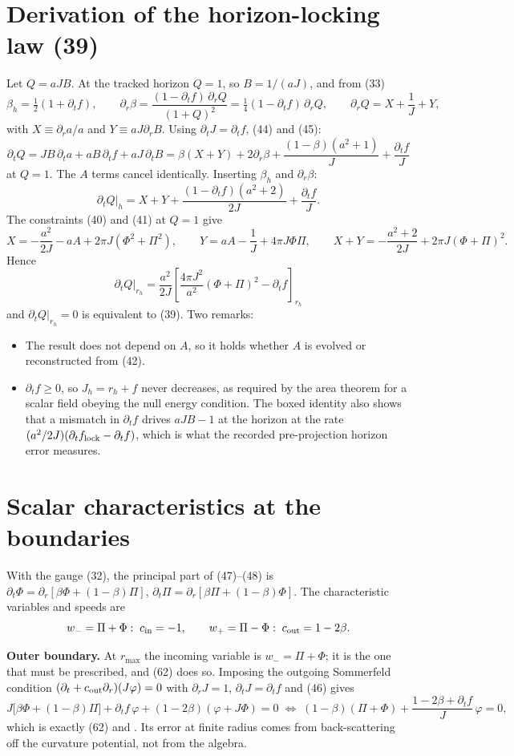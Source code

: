 \documentclass[11pt,a4paper]{article}
\newcommand{\dt}{\partial_t}
\newcommand{\dr}{\partial_r}
\newcommand{\fd}{\partial_t f}
\begin{document}
\appendix
\section{Derivation of the horizon-locking law (39)}\label{app:lock}

Let $Q=aJB$. At the tracked horizon $Q=1$, so $B=1/(aJ)$, and from (33)
\[
  \beta_h=\tfrac12(1+\fd),\qquad
  \dr\beta=\frac{(1-\fd)\,\dr Q}{(1+Q)^2}=\tfrac14(1-\fd)\,\dr Q,\qquad
  \dr Q=X+\frac1J+Y,
\]
with $X\equiv\dr a/a$ and $Y\equiv aJ\dr B$. Using $\dt J=\fd$, (44) and (45):
\[
  \dt Q=JB\,\dt a+aB\,\fd+aJ\,\dt B
  =\beta(X+Y)+2\dr\beta+\frac{(1-\beta)(a^2+1)}{J}+\frac{\fd}{J}
\]
at $Q=1$. The $A$ terms cancel identically. Inserting $\beta_h$ and $\dr\beta$:
\[
  \dt Q\big|_h=X+Y+\frac{(1-\fd)(a^2+2)}{2J}+\frac{\fd}{J}.
\]
The constraints (40) and (41) at $Q=1$ give
\[
  X=-\frac{a^2}{2J}-aA+2\pi J(\Phi^2+\Pi^2),\qquad
  Y=aA-\frac1J+4\pi J\Phi\Pi,\qquad
  X+Y=-\frac{a^2+2}{2J}+2\pi J(\Phi+\Pi)^2 .
\]
Hence
\[
  \boxed{\;\dt Q\big|_{r_h}=\frac{a^2}{2J}\left[\frac{4\pi J^2}{a^2}(\Phi+\Pi)^2-\fd\right]_{r_h}\;}
\]
and $\dt Q|_{r_h}=0$ is equivalent to (39). Two remarks:
\begin{itemize}
\item The result does not depend on $A$, so it holds whether $A$ is evolved or reconstructed from (42).
\item $\fd\ge0$, so $J_h=r_h+f$ never decreases, as required by the area theorem for a scalar field
  obeying the null energy condition. The boxed identity also shows that a mismatch in $\fd$ drives
  $aJB-1$ at the horizon at the rate $(a^2/2J)(\fd_{\rm lock}-\fd)$, which is what the recorded
  pre-projection horizon error measures.
\end{itemize}

\section{Scalar characteristics at the boundaries}\label{app:char}

With the gauge (32), the principal part of (47)--(48) is
$\dt\Phi=\dr[\beta\Phi+(1-\beta)\Pi]$, $\dt\Pi=\dr[\beta\Pi+(1-\beta)\Phi]$. The characteristic
variables and speeds are
\[
  w_-=\Pi+\Phi:\; c_{\rm in}=-1,\qquad
  w_+=\Pi-\Phi:\; c_{\rm out}=1-2\beta.
\]

\textbf{Outer boundary.} At $r_{\max}$ the incoming variable is $w_-=\Pi+\Phi$; it is the one
that must be prescribed, and (62) does so. Imposing the outgoing Sommerfeld condition
$(\dt+c_{\rm out}\dr)(J\varphi)=0$ with $\dr J=1$, $\dt J=\fd$ and (46) gives
\[
  J\bigl[\beta\Phi+(1-\beta)\Pi\bigr]+\fd\,\varphi+(1-2\beta)(\varphi+J\Phi)=0
  \;\Longleftrightarrow\;
  (1-\beta)(\Pi+\Phi)+\frac{1-2\beta+\fd}{J}\,\varphi=0,
\]
which is exactly (62) and . Its error at finite radius
comes from back-scattering off the curvature potential, not from the algebra.
\end{document}
